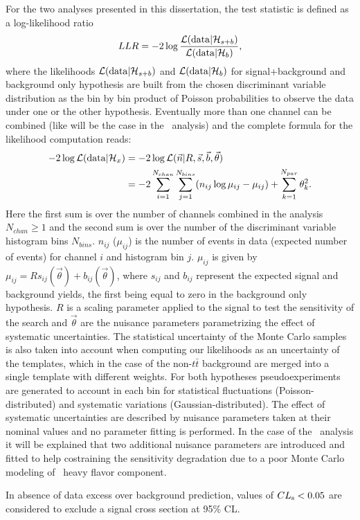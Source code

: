 For the two analyses presented in this dissertation, the test statistic
is defined as a log-likelihood ratio 
\begin{equation}\label{eq:llr}
LLR = -2\log \dfrac{\mathcal{L}({\rm data}|\mathcal{H}_{s+b})}{\mathcal{L}({\rm data}|\mathcal{H}_{b})},
\end{equation}
where the likelihoods $\mathcal{L}({\rm data}|\mathcal{H}_{s+b})$
 and $\mathcal{L}({\rm data}|\mathcal{H}_{b})$ for 
signal+background and background only hypothesis
are built from the chosen discriminant variable distribution 
as the bin by bin product of Poisson probabilities to observe the
data under one or the other hypothesis.
Eventually more than one channel can be combined (like will be
the case in the \htx\ analysis) and the complete formula for
the likelihood computation reads:
\begin{align}
-2 \log {\cal L}({\rm data}|\mathcal{H}_x) 
   & =  
   -2 \log {\cal L}(\vec{n}|R,\vec{s},\vec{b},\vec{\theta}) \notag\\
   & =  
  -2 \sum_{i=1}^{N_{chan}}\sum_{j=1}^{N_{bins}} (n_{ij}\log \mu_{ij}-\mu_{ij})+\sum_{k=1}^{N_{par}} \theta_k^2.
\end{align}
Here the first sum is over the number of channels
combined in the analysis $N_{chan}\geq 1$ and the 
second sum is over the number of the discriminant variable
histogram bins $N_{bins}$. $n_{ij}$ ($\mu_{ij}$) is the 
number of events in data (expected number of events) 
for channel $i$ and histogram bin $j$. $\mu_{ij}$ is given by
$\mu_{ij} = R s_{ij}(\vec{\theta})+ b_{ij}(\vec{\theta})$, 
where $s_{ij}$  and $b_{ij}$ represent the
expected signal and background yields, 
the first being equal to zero in the background only hypothesis.
$R$ is a scaling 
parameter applied to the signal
to test the sensitivity of the search and $\vec{\theta}$
are the nuisance parameters parametrizing the effect of
systematic uncertainties. 
The statistical uncertainty of the Monte Carlo samples is 
also taken into account when computing our likelihoods as
an uncertainty of the templates, which in the case of
the non-$t\bar{t}$ background are merged into a single
template  with different weights.
For both hypotheses pseudoexperiments are generated to
account in each bin for statistical fluctuations (Poisson-distributed)
and systematic variations (Gaussian-distributed). The effect of
systematic uncertainties are described by nuisance parameters taken
at their nominal values and no parameter fitting is performed.
In the case of the \htx\ analysis it will be explained that
two additional nuisance parameters are introduced and fitted
to help costraining the sensitivity degradation due to a poor
Monte Carlo modeling of \ttbar\ heavy flavor component.

In absence of data excess over background prediction, values of
$\cls{s}<0.05$ are considered to exclude a signal cross section
at 95\% CL.


